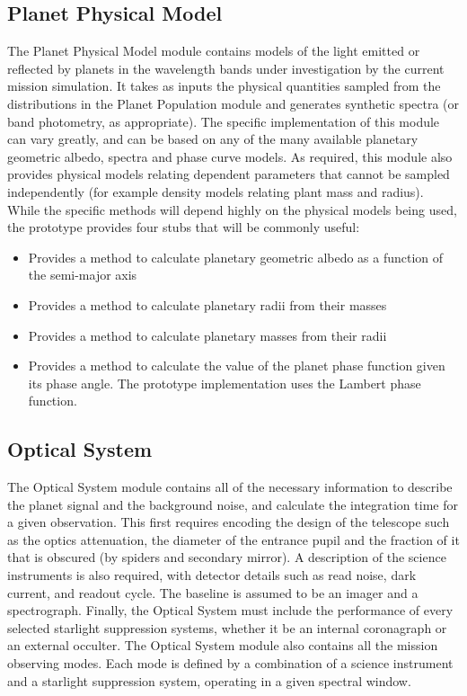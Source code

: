\documentclass[cleanfoot]{asme2ej}
\begin{document}

\subsection{Planet Physical Model} \label{sec:planetphysicalmodel}
The Planet Physical Model module contains models of the light emitted or reflected by planets in the wavelength bands under investigation by the current mission simulation.  It takes as inputs the physical quantities sampled from the distributions in the Planet Population module and generates synthetic spectra (or band photometry, as appropriate).  The specific implementation of this module can vary greatly, and can be based on any of the many available planetary geometric albedo, spectra and phase curve models.  As required, this module also provides physical models relating dependent parameters that cannot be sampled independently (for example density models relating plant mass and radius).  While the specific methods will depend highly on the physical models being used, the prototype provides four stubs that will be commonly useful:

\begin{itemize}[leftmargin=2in,font={\ttfamily}]
    \item[\texttt calc\_albedo\_from\_sma] Provides a method to calculate planetary geometric albedo as a function of the semi-major axis
    \item[\texttt calc\_radius\_from\_mass] Provides a method to calculate planetary radii from their masses
    \item[\texttt calc\_mass\_from\_radius] Provides a method to calculate planetary masses from their radii
    \item[\texttt calc\_Phi] Provides a method to calculate the value of the planet phase function given its phase angle.  The prototype implementation uses the Lambert phase function.
\end{itemize}



\subsection{Optical System}
The Optical System module contains all of the necessary information to describe the planet signal and the background noise, and calculate the integration time for a given observation.  This first requires encoding the design of the telescope such as the optics attenuation, the diameter of the entrance pupil and the fraction of it that is obscured (by spiders and secondary mirror). A description of the science instruments is also required, with detector details such as read noise, dark current, and readout cycle. The baseline is assumed to be an imager and a spectrograph. Finally, the Optical System must include the performance of every selected starlight suppression systems, whether it be an internal coronagraph or an external occulter. The Optical System module also contains all the mission observing modes. Each mode is defined by a combination of a science instrument and a starlight suppression system, operating in a given spectral window.
\end{document}
